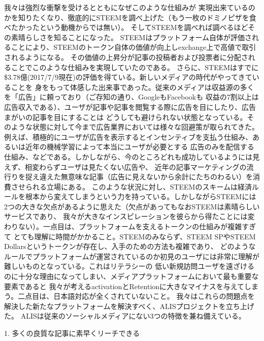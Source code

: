 \documentclass{jsarticle}
\begin{document}
我々は強烈な衝撃を受けるとともになぜこのような仕組みが
実現出来ているのかを知りたくなり、徹底的にSTEEMを調べ上げた（もう一枚のドミノピザを食べたかったという動機からでは無い）。
そしてSTEEMを調べれば調べるほどその素晴らしさを知ることになった。
STEEMはプラットフォーム自体が評価されることにより、STEEMのトークン自体の価値が向上しexchange上で高値で取引されるようになる。
その価値の上昇分が記事の投稿者および投票者に分配されることでこのような仕組みを実現していたのである。
さらに、STEEMはすでに\$3.78億(2017/7/9現在)の評価を得ている。新しいメディアの時代がやってきていることを
身をもって体感した出来事であった。従来のメディアは収益源の多くを「広告」に頼っており（ご存知の通り、GoogleもFacebookも
収益の7割以上は広告収入である）、ユーザが記事や記事を閲覧する際に広告を目にしたり、広告まがいの記事を目にすることは
どうしても避けられない状態となっている。そのような状態に対して今まで広告業界においては様々な回避策が取られてきた。
例えば、積極的にユーザが広告を表示するとインセンティブを支払う仕組み、あるいは近年の機械学習によって本当にユーザが必要とする
広告のみを配信する仕組み、などである。しかしながら、今のところどれも成功しているようには見えず、相変わらずユーザは見たくない広告や、
近年の記事マーケティングの流行りを捉え違えた無意味な記事（広告に見えないから余計にたちのわるい）を消費させられる立場にある。
このような状況に対し、STEEMのスキームは経済ルールを根本から変えてしまうという力を持っている。しかしながらSTEEMには
2つの大きな欠点があるように思えた（欠点があってもなおSTEEMは素晴らしいサービスであり、
我々が大きなインスピレーションを彼らから得たことには変わりない）。一点目は、プラットフォームを支えるトークンの仕組みが複雑すぎて
とても理解に時間がかかること。STEEMのみならず、STEEM SPやSTEEM Dollarsというトークンが存在し、入手のための方法も複雑であり、
どのようなルールでプラットフォームが運営されているのか初見のユーザには非常に理解が難しいものとなっている。これはリテラシーの
低い新規訪問ユーザを遠ざけるのに十分な理由になってしまい、メディアプラットフォームにおいて最も重要な要素であると
我々が考えるactivationとRetentionに大きなマイナスを与えてしまう。二点目は、日本語対応が全くされていないこと。
我々はこれらの問題点を解決した新たなプラットフォームを解決すべく、ALISプロジェクトを立ち上げた。
ALISは従来のソーシャルメディアにない3つの特徴を兼ね備えている。

1. 多くの良質な記事に素早くリーチできる
\end{document}

